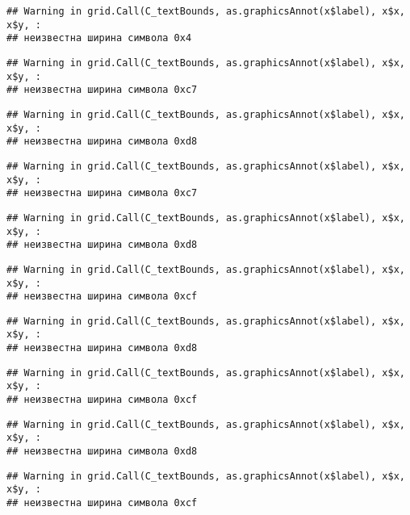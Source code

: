 \documentclass[
]{article}
\begin{document}
\begin{verbatim}
## Warning in grid.Call(C_textBounds, as.graphicsAnnot(x$label), x$x, x$y, :
## неизвестна ширина символа 0x4
\end{verbatim}

\begin{verbatim}
## Warning in grid.Call(C_textBounds, as.graphicsAnnot(x$label), x$x, x$y, :
## неизвестна ширина символа 0xc7
\end{verbatim}

\begin{verbatim}
## Warning in grid.Call(C_textBounds, as.graphicsAnnot(x$label), x$x, x$y, :
## неизвестна ширина символа 0xd8
\end{verbatim}

\begin{verbatim}
## Warning in grid.Call(C_textBounds, as.graphicsAnnot(x$label), x$x, x$y, :
## неизвестна ширина символа 0xc7
\end{verbatim}

\begin{verbatim}
## Warning in grid.Call(C_textBounds, as.graphicsAnnot(x$label), x$x, x$y, :
## неизвестна ширина символа 0xd8
\end{verbatim}

\begin{verbatim}
## Warning in grid.Call(C_textBounds, as.graphicsAnnot(x$label), x$x, x$y, :
## неизвестна ширина символа 0xcf
\end{verbatim}

\begin{verbatim}
## Warning in grid.Call(C_textBounds, as.graphicsAnnot(x$label), x$x, x$y, :
## неизвестна ширина символа 0xd8
\end{verbatim}

\begin{verbatim}
## Warning in grid.Call(C_textBounds, as.graphicsAnnot(x$label), x$x, x$y, :
## неизвестна ширина символа 0xcf
\end{verbatim}

\begin{verbatim}
## Warning in grid.Call(C_textBounds, as.graphicsAnnot(x$label), x$x, x$y, :
## неизвестна ширина символа 0xd8
\end{verbatim}

\begin{verbatim}
## Warning in grid.Call(C_textBounds, as.graphicsAnnot(x$label), x$x, x$y, :
## неизвестна ширина символа 0xcf
\end{verbatim}
\end{document}
